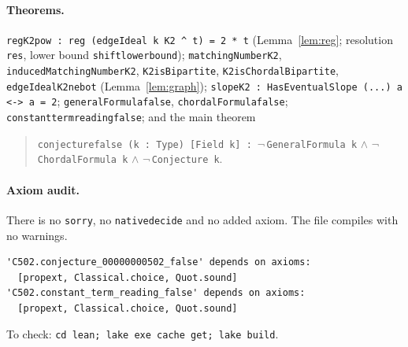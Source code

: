 \documentclass[11pt]{article}
\theoremstyle{definition}
\theoremstyle{remark}
\renewcommand{\_}{\oldus\allowbreak}
\begin{document}
\paragraph{Theorems.}
\texttt{reg\_K2\_pow : reg (edgeIdeal k K2 \^{} t) = 2 * t} (Lemma~\ref{lem:reg}; resolution \texttt{res},
lower bound \texttt{shift\_lower\_bound});
\texttt{matchingNumber\_K2}, \texttt{inducedMatchingNumber\_K2}, \texttt{K2\_isBipartite},
\texttt{K2\_isChordalBipartite}, \texttt{edgeIdeal\_K2\_ne\_bot} (Lemma~\ref{lem:graph});
\texttt{slope\_K2 : HasEventualSlope (...) a <-> a = 2}; \texttt{generalFormula\_false},
\texttt{chordalFormula\_false}; \texttt{constant\_term\_reading\_false}; and the main theorem
\begin{quote}
\texttt{conjecture\_00000000502\_false (k : Type) [Field k] :}\
$\neg\,$\texttt{GeneralFormula k} $\wedge$ $\neg\,$\texttt{ChordalFormula k} $\wedge$
$\neg\,$\texttt{Conjecture k}.
\end{quote}

\paragraph{Axiom audit.} There is no \texttt{sorry}, no \texttt{native\_decide} and no added axiom.
The file compiles with no warnings.
\begin{verbatim}
'C502.conjecture_00000000502_false' depends on axioms:
  [propext, Classical.choice, Quot.sound]
'C502.constant_term_reading_false' depends on axioms:
  [propext, Classical.choice, Quot.sound]
\end{verbatim}
To check: \texttt{cd lean; lake exe cache get; lake build}.
\end{document}
